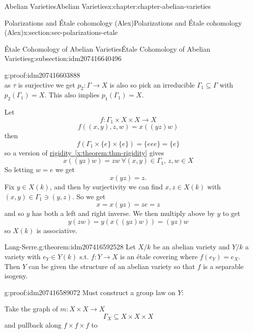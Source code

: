 \documentclass[oneside,10pt,]{book}
\numberwithin{equation}{section}
\begin{document}
\begin{chapterptx}{Abelian Varieties}{}{Abelian Varieties}{}{}{x:chapter:chapter-abelian-varieties}
\begin{sectionptx}{Polarizations and Étale cohomology (Alex)}{}{Polarizations and Étale cohomology (Alex)}{}{}{x:section:sec-polarizations-etale}
\begin{subsectionptx}{Étale Cohomology of Abelian Varieties}{}{Étale Cohomology of Abelian Varieties}{}{}{g:subsection:idm207416640496}
\begin{proofptx}{}{g:proof:idm207416603888}
\begin{equation*}
\end{equation*}
as \(\tau \) is surjective we get \(p_2 \colon \Gamma \to X\) is also so pick an irreducible \(\Gamma_1 \subseteq \Gamma\) with \(p_2(\Gamma_1) = X\). This also implies \(p_1(\Gamma_1) = X\).%
\par
Let%
\begin{equation*}
f\colon \Gamma_1 \times X\times X \to X
\end{equation*}
%
\begin{equation*}
f((x,y),z,w) = x((yz)w)
\end{equation*}
then%
\begin{equation*}
f(\Gamma_1 \times\{e\}\times\{e\}) = \{eee\} = \{e\}
\end{equation*}
so a version of \hyperref[x:theorem:thm-rigidity]{rigidity~\ref{x:theorem:thm-rigidity}} gives%
\begin{equation*}
x((yz)w) = zw\ \forall (x,y) \in \Gamma_1,\,z,w\in X
\end{equation*}
So letting \(w = e\) we get%
\begin{equation*}
x(yz) = z\text{.}
\end{equation*}
Fix \(y \in X(k)\), and then by surjectivity we can find \(x,z \in X(k)\) with \((x,y)\in \Gamma_1 \ni (y,z)\). So we get%
\begin{equation*}
x = x(yz) = ze = z
\end{equation*}
and so \(y\) has both a left and right inverse. We then multiply above by \(y\) to get%
\begin{equation*}
y(zw) = y(x((yz)w)) = (yz)w
\end{equation*}
so \(X(k)\) is associative.%
\end{proofptx}
\begin{theorem}{Lang-Serre.}{}{g:theorem:idm207416592528}%
Let \(X/k\) be an abelian variety and \(Y/k\) a variety with \(e_Y\in Y(k)\) s.t. \(f\colon Y \to X\) is an étale covering where \(f(e_Y) = e_X\). Then \(Y\) can be given the structure of an abelian variety so that \(f\) is a separable isogeny.%
\end{theorem}
\begin{proofptx}{}{g:proof:idm207416589072}
Must construct a group law on \(Y\):%
\par
Take the graph of \(m\colon X\times X \to X\)%
\begin{equation*}
\Gamma_X \subseteq X\times X\times X
\end{equation*}
and pullback along \(f\times f\times f\) to%
\begin{equation*}

\end{equation*}
\end{proofptx}
\end{subsectionptx}
\end{sectionptx}
\end{chapterptx}
\end{document}
